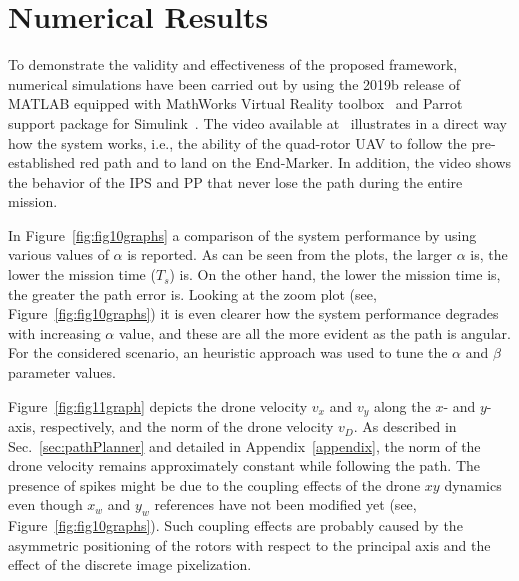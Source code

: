 \documentclass[a4paper,twocolumn,10pt]{article}
\begin{document}
    \section{Numerical Results}
    \label{sec:simulationsResults}

    To demonstrate the validity and effectiveness of the proposed framework, numerical simulations have been carried out by using the 2019b release of MATLAB equipped with MathWorks Virtual Reality 
    toolbox~\cite{16_Mathworks_url} and Parrot support package for Simulink~\cite{15_Mathworks_url}. 
    The video available at~\cite{YouTubeVideo} illustrates in a direct way how the system works, i.e., the ability of the quad-rotor UAV to follow the pre-established red path and to land on the End-Marker. In addition, the video shows the behavior of the IPS and PP that never lose the path during the entire mission. 

    In Figure~\ref{fig:fig10graphs} a comparison of the system performance by using various values of $\alpha$ is reported. As can be seen from the plots, the larger $\alpha$ is, the lower the mission time ($T_s$) is. On the other hand, the lower the mission time is, the greater the path 
    error is. Looking at the zoom plot (see, Figure~\ref{fig:fig10graphs}) it is even clearer how the system performance degrades with increasing $\alpha$ value, and these are all the more evident as the path is angular. For the considered scenario, an heuristic approach was used to tune the $\alpha$ and $\beta$ parameter values.

    Figure~\ref{fig:fig11graph} depicts the drone velocity $v_x$ and $v_y$ along the $x$- and $y$-axis, respectively, and the norm of the drone velocity $v_D$. As described in 
    Sec.~\ref{sec:pathPlanner} and detailed in Appendix~\ref{appendix}, the norm of the drone velocity remains approximately constant while following the path. The presence of spikes might be due to the coupling effects of the drone $xy$ dynamics even though $x_w$ and $y_w$ references have not been 
    modified yet (see, Figure~\ref{fig:fig10graphs}). Such coupling effects are probably caused by the asymmetric positioning of the rotors with respect to the principal axis and the effect of the discrete image pixelization. 
\end{document}
